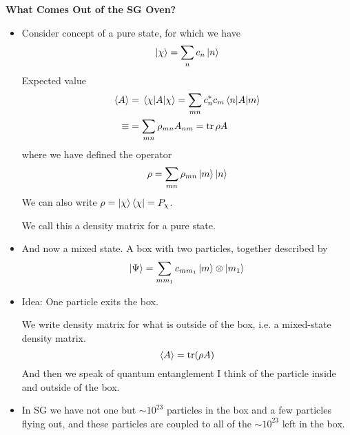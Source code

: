 \documentclass[11pt, a4paper]{article}
\begin{document}
\textbf{What Comes Out of the SG Oven?}
\begin{itemize}
    \item Consider concept of a pure state, for which we have
    \begin{equation*}
        \ket{\chi} = \sum_{n} c_{n}\ket{n}
    \end{equation*}
    Expected value
    \begin{align*}
        \ev{A} &= \mel{\chi}{A}{\chi} = \sum_{mn}c_{n}^{*}c_{m}\mel{n}{A}{m}  \\
        \equiv & = \sum_{mn} \rho_{mn}A_{nm} = \tr \rho A
    \end{align*}
    where we have defined the operator
    \begin{equation*}
        \rho = \sum_{mn}\rho_{mn}\ket{m}\ket{n}
    \end{equation*}
    We can also write $ \rho = \ket{\chi}\bra{\chi} = P_{\chi} $. 

    We call this a density matrix for a pure state.
    
    \item And now a mixed state. A box with two particles, together described by
    \begin{equation*}
        \ket{\Psi} = \sum_{m m_{1}} c_{mm_{1}} \ket{m}\otimes \ket{m_{1}}
    \end{equation*}
    
    \item Idea: One particle exits the box.

    We write density matrix for what is outside of the box, i.e. a mixed-state density matrix.
    \begin{equation*}
        \ev{A} = \tr(\rho A) 
    \end{equation*}
    And then we speak of quantum entanglement I think of the particle inside and outside of the box. 


    \item In SG we have not one but $ \sim 10^{23} $ particles in the box and a few particles flying out, and these particles are coupled to all of the $ \sim 10^{23} $ left in the box.
    
    
    
    
    
    
    
    
    
\end{itemize}
\end{document}
